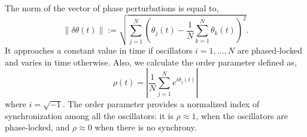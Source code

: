 \documentclass[%
 reprint,
 amsmath,amssymb,
 aip,
]{revtex4-2}
\def \bb {\pmb{b}}
\theoremstyle{italichead}
\theoremstyle{definition}
\begin{document}
{The norm of the vector of phase perturbations is equal to,
\begin{equation}
    \| \delta \theta(t) \| := \sqrt{\sum_{j=1 }^{N}\left(\theta_j (t) - \frac{1}{N} \sum_{k=1}^{N} \theta_k (t)  \right)^2}. 
\end{equation}
It approaches a constant value in time if oscillators $i=1,\hdots, N$ are phased-locked and varies in time otherwise.
Also, we calculate the order parameter defined as,
\begin{equation} \label{eq:order}
{
    \rho(t) = \left| \dfrac{1}{N} \sum_{j=1}^{N} e^{i \theta_j(t)} \right|
}
\end{equation}
where $i = \sqrt{-1}$. The order parameter provides a normalized index of synchronization among all the oscillators: it is $\rho \approx 1$, when the oscillators are phase-locked, and $\rho \approx 0$ when there is no synchrony.
}
\end{document}
